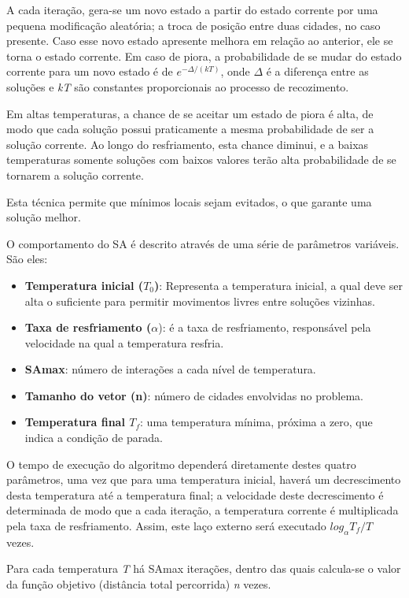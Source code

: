 \documentclass[a4paper, 12pt]{article}
\begin{document}
A cada iteração, gera-se um novo estado a partir do estado corrente por uma pequena modificação aleatória; a troca de posição entre duas cidades, no caso presente. Caso esse novo estado apresente melhora em relação ao anterior, ele se torna o estado corrente. Em caso de piora, a probabilidade de se mudar do estado corrente para um novo estado é de $e^{-\Delta/(kT)}$, onde $\Delta$ é a diferença entre as soluções e \textit{kT} são constantes proporcionais ao processo de recozimento\cite{kirk}.

Em altas temperaturas, a chance de se aceitar um estado de piora é alta, de modo que cada solução possui praticamente a mesma probabilidade de ser a solução corrente. Ao longo do resfriamento, esta chance diminui, e a baixas temperaturas somente soluções com baixos valores terão alta probabilidade de se tornarem a solução corrente. 

Esta técnica permite que mínimos locais sejam evitados, o que garante uma solução melhor.

O comportamento do SA é descrito através de uma série de parâmetros variáveis. São eles:

\begin{itemize}
\item \textbf{Temperatura inicial ($T_0$)}: Representa a temperatura inicial, a qual deve ser alta o suficiente para permitir movimentos livres entre soluções vizinhas.
\item \textbf{Taxa de resfriamento ($\alpha$}): é a taxa de resfriamento, responsável pela velocidade na qual a temperatura resfria.
\item \textbf{SAmax}: número de interações a cada nível de temperatura.
\item \textbf{Tamanho do vetor (n)}: número de cidades envolvidas no problema.
\item \textbf{Temperatura final $T_f$}: uma temperatura mínima, próxima a zero, que indica a condição de parada.
\end{itemize}

O tempo de execução do algoritmo dependerá diretamente destes quatro parâmetros, uma vez que para uma temperatura inicial, haverá um decrescimento desta temperatura até a temperatura final; a velocidade deste decrescimento é determinada de modo que a cada iteração, a temperatura corrente é multiplicada pela taxa de resfriamento. Assim, este laço externo será executado $log_\alpha T_f/T$ vezes.

Para cada temperatura \textit{T} há SAmax iterações, dentro das quais calcula-se o valor da função objetivo (distância total percorrida) \textit{n} vezes.
\end{document}
